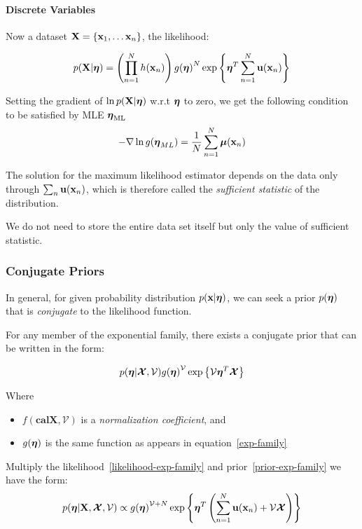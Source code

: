 \paragraph{Discrete Variables}
Now a dataset $\mathbf{X} = \{\mathbf{x}_1, \dots \mathbf{x}_n\}$, the likelihood:

\begin{equation}
    p(\mathbf{X}|\boldsymbol\eta) = \left( \prod_{n=1}^N h(\mathbf{x}_n) \right) {g(\boldsymbol\eta)}^N
    \exp\left\{ \boldsymbol\eta^T \sum_{n=1}^N \mathbf{u}(\mathbf{x}_n) \right\}
    \label{likelihood-exp-family}
\end{equation}

Setting the gradient of $\ln p(\mathbf{X}|\boldsymbol\eta)$ w.r.t $\boldsymbol\eta$ to zero, we get
the following condition to be satisfied by MLE $\boldsymbol\eta_{\text{ML}}$
\begin{equation}
    -\nabla \ln{g(\boldsymbol\eta_{ML})} = \frac{1}{N} \sum_{n=1}^N \boldsymbol\mu
    (\mathbf{x}_{n})
\end{equation}

The solution for the maximum likelihood estimator depends on the data only
through $\sum_n \mathbf{u}(\mathbf{x}_n)$, which is therefore called the
\emph{sufficient statistic} of the distribution.

We do not need to store the entire data set itself but only the value of
sufficient statistic.
\subsubsection{Conjugate Priors}
In general, for given probability distribution $p(\mathbf{x}|\boldsymbol\eta)$, we can
seek a prior $p(\boldsymbol\eta)$ that is \emph{conjugate} to the likelihood
function.

For any member of the exponential family, there exists a conjugate prior
that can be written in the form:

\begin{equation}
    {p(\boldsymbol\eta|\boldsymbol{\mathcal{X}},
    \mathcal{V})g(\boldsymbol\eta)}^{\mathcal{V}}\exp{\left\{\mathcal{V}\boldsymbol\eta^T\boldsymbol{\mathcal{X}}\right\}}
    \label{prior-exp-family}
\end{equation}

Where
\begin{itemize}
    \item $f(\boldsymbol{calX}, \mathcal{V})$ is a \emph{normalization
        coefficient}, and
    \item $g(\boldsymbol\eta)$ is the same function as appears in
        equation~\ref{exp-family}
\end{itemize}

Multiply the likelihood~\ref{likelihood-exp-family} and
prior~\ref{prior-exp-family} we have the form:
\begin{equation}
    p(\boldsymbol\eta|\mathbf{X}, \boldsymbol{\mathcal{X}}, \mathcal{V})\propto
    {g(\boldsymbol\eta)}^{\mathcal{V}+N}\exp\left\{ \boldsymbol\eta^T\left( \sum_{n=1}^N
    \mathbf{u}(\mathbf{x}_n) + \mathcal{V}\boldsymbol{\mathcal{X}} \right) \right\}
    \label{prior-times-likelihood}
\end{equation}

